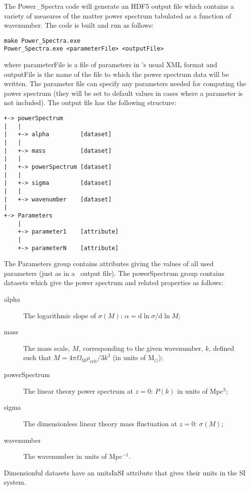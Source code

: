 The {\normalfont \ttfamily Power\_Spectra} code will generate an HDF5 output file which contains a variety of measures of the matter power spectrum tabulated as a function of wavenumber. The code is built and run as follows:
\begin{verbatim}
make Power_Spectra.exe
Power_Spectra.exe <parameterFile> <outputFile>
\end{verbatim}
where {\normalfont \ttfamily parameterFile} is a file of parameters in \glc's usual XML format and {\normalfont \ttfamily outputFile} is the name of the file to which the power spectrum data will be written. The parameter file can specify any parameters needed for computing the power spectrum (they will be set to default values in cases where a parameter is not included).
The output file has the following structure:
\begin{verbatim}
+-> powerSpectrum
|   |
|   +-> alpha         [dataset]
|   |
|   +-> mass          [dataset]
|   |
|   +-> powerSpectrum [dataset]
|   |
|   +-> sigma         [dataset]
|   |
|   +-> wavenumber    [dataset]
|    
+-> Parameters
    |
    +-> parameter1    [attribute]
    |
    +-> parameterN    [attribute]
\end{verbatim}
The {\normalfont \ttfamily Parameters} group contains attributes giving the values of all used parameters (just as in a \glc\ output file). The {\normalfont \ttfamily powerSpectrum} group contains datasets which give the power spectrum and related properties as follows:
\begin{description}
\item [{\normalfont \ttfamily alpha}] The logarithmic slope of $\sigma(M)$: $\alpha = \mathrm{d} \ln \sigma / \mathrm{d} \ln M$;
\item [{\normalfont \ttfamily mass}] The mass scale, $M$, corresponding to the given wavenumber, $k$, defined such that $M=4 \pi \Omega_\mathrm{M} \rho_\mathrm{crit} / 3 k^3$ (in units of $\mathrm{M}_\odot$);
\item [{\normalfont \ttfamily powerSpectrum}] The linear theory power spectrum at $z=0$: $P(k)$ in units of Mpc$^3$;
\item [{\normalfont \ttfamily sigma}] The dimensionless linear theory mass fluctuation at $z=0$: $\sigma(M)$;
\item [{\normalfont \ttfamily wavenumber}] The wavenumber in units of Mpc$^{-1}$.
\end{description}
Dimensionful datasets have an {\normalfont \ttfamily unitsInSI} attribute that gives their units in the SI system.
